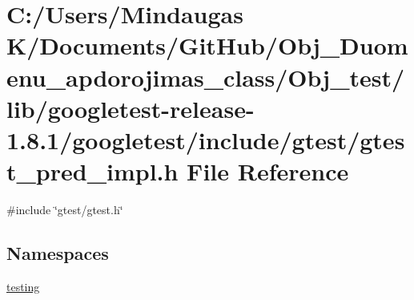 \hypertarget{_obj__test_2lib_2googletest-release-1_88_81_2googletest_2include_2gtest_2gtest__pred__impl_8h}{}\section{C\+:/\+Users/\+Mindaugas K/\+Documents/\+Git\+Hub/\+Obj\+\_\+\+Duomenu\+\_\+apdorojimas\+\_\+class/\+Obj\+\_\+test/lib/googletest-\/release-\/1.8.1/googletest/include/gtest/gtest\+\_\+pred\+\_\+impl.h File Reference}
\label{_obj__test_2lib_2googletest-release-1_88_81_2googletest_2include_2gtest_2gtest__pred__impl_8h}
{\ttfamily \#include \char`\"{}gtest/gtest.\+h\char`\"{}}\newline
\subsection*{Namespaces}
\begin{DoxyCompactItemize}
\item 
 \mbox{\hyperlink{namespacetesting}{testing}}
\end{DoxyCompactItemize}
